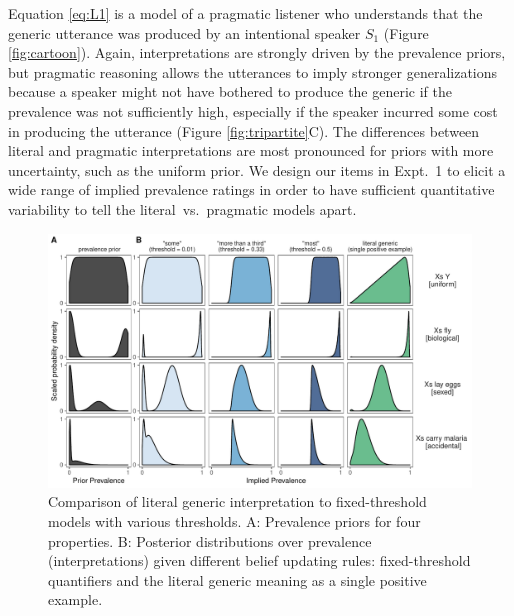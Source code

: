 \documentclass[floatsintext,doc]{apa6}
\begin{document}
Equation \ref{eq:L1} is a model of a pragmatic listener who understands that the generic utterance was produced by an intentional speaker \(S_1\) (Figure \ref{fig:cartoon}).
Again, interpretations are strongly driven by the prevalence priors, but pragmatic reasoning allows the utterances to imply stronger generalizations because a speaker might not have bothered to produce the generic if the prevalence was not sufficiently high, especially if the speaker incurred some cost in producing the utterance (Figure \ref{fig:tripartite}C).
The differences between literal and pragmatic interpretations are most pronounced for priors with more uncertainty, such as the uniform prior. 
We design our items in Expt.~1 to elicit a wide range of implied prevalence ratings in order to have sufficient quantitative variability to tell the literal~vs.~pragmatic models apart.




\begin{figure}
\centering
\includegraphics{figs/modelSimulations-noPrag.pdf}
\caption{\label{fig:modelSimulations}Comparison of literal generic interpretation to fixed-threshold models with various thresholds. A: Prevalence priors for four properties. B: Posterior distributions over prevalence (interpretations) given different belief updating rules: fixed-threshold quantifiers and the literal generic meaning as a single positive example.}
\end{figure}
\end{document}
